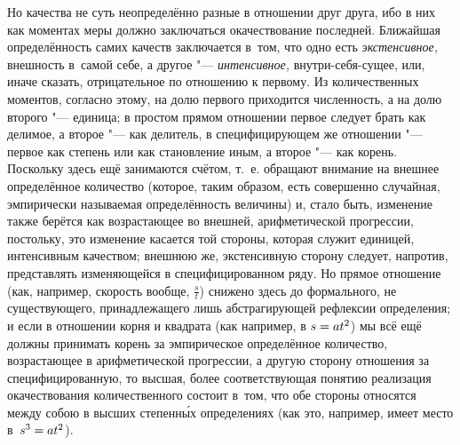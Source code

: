 Но качества не суть неопределённо разные в отношении друг друга, ибо в них как
моментах меры должно заключаться окачествование последней. Ближайшая
определённость самих качеств заключается в~том, что одно есть
{\em экстенсивное,} внешность в~самой себе, а другое "--- {\em интенсивное,}
внутри-себя-сущее, или, иначе сказать, отрицательное по отношению к первому. Из
количественных моментов, согласно этому, на долю первого приходится численность,
а на долю второго "--- единица; в простом прямом отношении первое следует
брать как делимое, а второе "--- как делитель, в специфицирующем же отношении
"--- первое как степень или как становление иным, а второе "--- как корень.
Поскольку здесь ещё занимаются счётом, т.~е. обращают внимание на внешнее
определённое количество (которое, таким образом, есть совершенно случайная,
эмпирически называемая определённость величины) и, стало быть, изменение также
берётся как возрастающее во внешней, арифметической прогрессии, постольку,
это изменение касается той стороны, которая служит единицей, интенсивным
качеством; внешнюю же, экстенсивную сторону следует, напротив, представлять
изменяющейся в специфицированном ряду. Но прямое отношение (как, например,
скорость вообще, $\frac s t$) снижено здесь до формального, не существующего,
принадлежащего лишь абстрагирующей рефлексии определения; и если в отношении
корня и квадрата (как например, в $s\hm=at^2$) мы всё ещё должны принимать
корень за эмпирическое определённое количество, возрастающее в арифметической
прогрессии, а другую сторону отношения за специфицированную, то высшая, более
соответствующая понятию реализация окачествования количественного состоит
в~том, что обе стороны относятся между собою в высших степенн\'{ы}х
определениях (как это, например, имеет место в~$s^3\hm=at^2$).

\subsubsection[Примечание]{}

